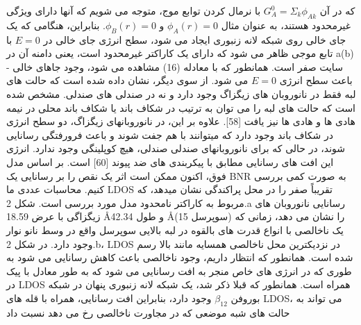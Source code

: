 که در آن $G^0_A =\Sigma_k \phi_{Ak}$ با نرمال کردن توابع موج، متوجه می شویم که آنها دارای ویژگی غیرمحدود هستند، به عنوان مثال $\phi_{A}(r) = 0$ و $\phi_{B}(r) = 0$. بنابراین، هنگامی که یک جای خالی روی شبکه لانه زنبوری ایجاد می شود، سطح انرژی جای خالی در $E = 0$ با تابع موجی ظاهر می شود که دارای یک کاراکتر غیرمحدود است، یعنی دامنه آن در a(b) - سایت صفر است. همانطور که با معادله (16) مشاهده می شود، وجود جاهای خالی باعث سطح انرژی $E = 0$ می شود. از سوی دیگر، نشان داده شده است که حالت های لبه فقط در نانوروبان های زیگزاگ وجود دارد و نه در صندلی های صندلی. مشخص شده است که حالت های لبه را می توان به ترتیب در شکاف باند یا شکاف باند محلی در نیمه هادی ها و هادی ها نیز یافت [58]. علاوه بر این، در نانوروبانهای زیگزاگ، دو سطح انرژی در شکاف باند وجود دارد که میتوانند با هم جفت شوند و باعث فرورفتگی رسانایی شوند، در حالی که برای نانوروبانهای صندلی صندلی، هیچ کوپلینگی وجود ندارد. انرژی این افت های رسانایی مطابق با پیکربندی های ضد پیوند [60] است. بر اساس مدل فوق، اکنون ممکن است اثر یک نقص را بر رسانایی یک BNR به صورت کمی بررسی کنیم. محاسبات عددی ما LDOS تقریباً صفر را در محل پراکندگی نشان میدهد، که مربوط به کاراکتر نامحدود مدل مورد بررسی است. شکل 2.a رسانایی نانوروبان های زیگزاگی با عرض 18.59 \AA و طول 42.34 \AA (15 سوپرسل) را نشان می دهد، زمانی که یک ناخالصی با انواع قدرت های بالقوه در لبه بالایی سوپرسل واقع در وسط نانو نوار وجود دارد. در شکل 2.b، LDOS در نزدیکترین محل ناخالصی همسایه مانند بالا رسم شده است. همانطور که انتظار داریم، وجود ناخالصی باعث کاهش رسانایی می شود به طوری که در انرژی های خاص منجر به افت رسانایی می شود که به طور معادل با پیک در LDOS همراه است. همانطور که قبلا ذکر شد، یک شبکه لانه زنبوری پنهان در شبکه بوروفن $\beta_{12}$ وجود دارد، بنابراین افت رسانایی، همراه با قله های LDOS، می تواند به حالت های شبه موضعی که در مجاورت ناخالصی رخ می دهد نسبت داد
